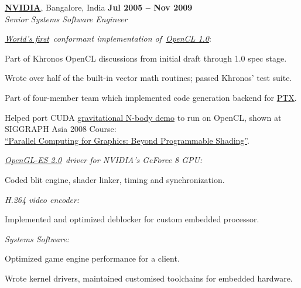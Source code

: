 \documentclass[10pt]{article}
\newenvironment{outerlist}[1][\enskip\textbullet]%
        {\begin{itemize}[#1]}{\end{itemize}%
         \vspace{-.6\baselineskip}}
\newenvironment{innerlist}[1][\enskip\textbullet]%
        {\begin{compactitem}[#1]}{\end{compactitem}}
\begin{document}
\href{http://www.nvidia.com/}{\textbf{NVIDIA}},
Bangalore, India \hfill \textbf{Jul 2005 -- Nov 2009}\\
\textit{Senior Systems Software Engineer}
\begin{outerlist}

\item[] \href{http://www.nvidia.com/object/cuda_opencl_new.html}{\textit{World's first}}~\textit{conformant implementation of}~\href{http://www.khronos.org/opencl/}{\textit{OpenCL 1.0}}:
\begin{innerlist}
\item Part of Khronos OpenCL discussions from initial draft through 1.0 spec stage.
\item Wrote over half of the built-in vector math routines; passed Khronos' test suite.
\item Part of four-member team which implemented code generation backend for \href{http://www.nvidia.com/content/CUDA-ptx_isa_1.4.pdf}{PTX}.
\item Helped port CUDA \href{http://www.youtube.com/watch?v=r1sN1ELJfNo}{gravitational N-body demo} to run on OpenCL, shown at SIGGRAPH Asia 2008 Course:\\
         \href{http://www.siggraph.org/asia2008/attendees/courses/15.php}{``Parallel Computing for Graphics: Beyond Programmable Shading''}.
\end{innerlist}

\item[] \href{http://www.khronos.org/opengles/2_X/}{\textit{OpenGL-ES 2.0}}~\textit{driver for NVIDIA's GeForce 8 GPU:}
\begin{innerlist}
\item Coded blit engine, shader linker, timing and synchronization.
\end{innerlist}

\item[] \textit{H.264 video encoder:}
\begin{innerlist}
\item Implemented and optimized deblocker for custom embedded processor.
\end{innerlist}

\item[] \textit{Systems Software:}
\begin{innerlist}
\item Optimized game engine performance for a client.
\item Wrote kernel drivers, maintained customised toolchains for embedded hardware.
\end{innerlist}

\end{outerlist}
\end{document}
